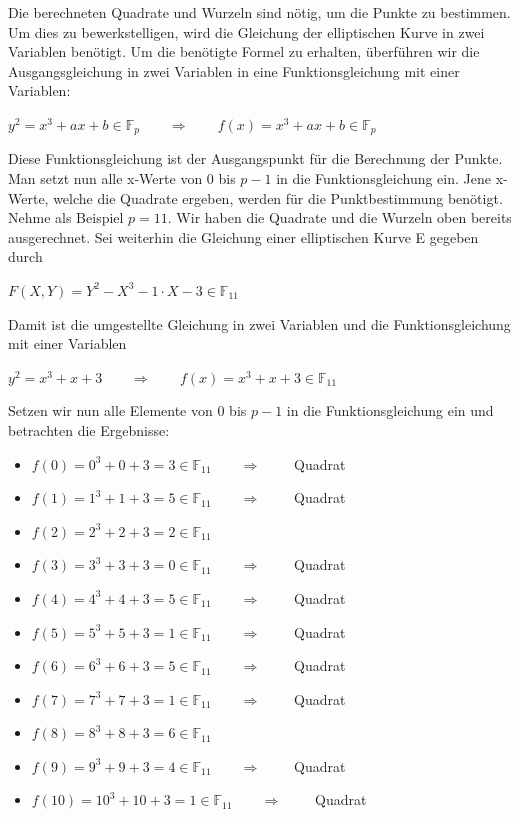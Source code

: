 Die berechneten Quadrate und Wurzeln sind nötig, um die Punkte zu bestimmen. Um dies zu bewerkstelligen, wird die Gleichung der elliptischen Kurve in zwei Variablen benötigt. Um die benötigte Formel zu erhalten, überführen wir die Ausgangsgleichung in zwei Variablen in eine Funktionsgleichung mit einer Variablen:
\begin{center}
$y^{2} =  x^{3} + ax + b  \in \mathbb{F}_{p} \qquad \Longrightarrow \qquad f(x) =  x^{3} + ax + b \in \mathbb{F}_{p}$
\end{center}

Diese Funktionsgleichung ist der Ausgangspunkt für die Berechnung der Punkte. Man setzt nun alle x-Werte von $0$ bis $p - 1$ in die Funktionsgleichung ein. Jene x-Werte, welche die Quadrate ergeben, werden für die Punktbestimmung benötigt. Nehme als Beispiel $p = 11$. Wir haben die Quadrate und die Wurzeln oben bereits ausgerechnet. Sei weiterhin die Gleichung einer elliptischen Kurve E gegeben durch
\begin{center}
$F(X, Y) =  Y^{2} - X^{3} - 1 \cdot X - 3 \in \mathbb{F}_{11}$
\end{center}

Damit ist die umgestellte Gleichung in zwei Variablen und die Funktionsgleichung mit einer Variablen
\begin{center}
$y^{2} =  x^{3} + x + 3 \qquad \Longrightarrow \qquad f(x) =  x^{3} + x + 3 \in \mathbb{F}_{11}$
\end{center}
Setzen wir nun alle Elemente von $0$ bis $p - 1$ in die Funktionsgleichung ein und betrachten die Ergebnisse:

\begin{itemize}
\item $f(0) =  0^{3} + 0 + 3 = 3 \in \mathbb{F}_{11} \qquad \Longrightarrow \qquad$ Quadrat
\item $f(1) =  1^{3} + 1 + 3 = 5 \in \mathbb{F}_{11} \qquad \Longrightarrow \qquad$ Quadrat
\item $f(2) =  2^{3} + 2 + 3 = 2 \in \mathbb{F}_{11}$
\item $f(3) =  3^{3} + 3 + 3 = 0 \in \mathbb{F}_{11} \qquad \Longrightarrow \qquad$ Quadrat
\item $f(4) =  4^{3} + 4 + 3 = 5 \in \mathbb{F}_{11} \qquad \Longrightarrow \qquad$ Quadrat
\item $f(5) =  5^{3} + 5 + 3 = 1 \in \mathbb{F}_{11} \qquad \Longrightarrow \qquad$ Quadrat
\item $f(6) =  6^{3} + 6 + 3 = 5 \in \mathbb{F}_{11} \qquad \Longrightarrow \qquad$ Quadrat
\item $f(7) =  7^{3} + 7 + 3 = 1 \in \mathbb{F}_{11} \qquad \Longrightarrow \qquad$ Quadrat
\item $f(8) =  8^{3} + 8 + 3 = 6 \in \mathbb{F}_{11}$
\item $f(9) =  9^{3} + 9 + 3 = 4 \in \mathbb{F}_{11} \qquad \Longrightarrow \qquad$ Quadrat
\item $f(10) = 10^{3} + 10 + 3 = 1 \in \mathbb{F}_{11} \qquad \Longrightarrow \qquad$ Quadrat
\end{itemize}

